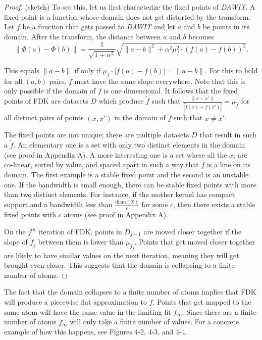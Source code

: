 \begin{proof} (sketch) To see this, let us first characterize the fixed points of
\textit{DAWIT}. A fixed point is a function whose domain does not get
distorted by the transform.
Let $f$ be a function that gets passed to \textit{DAWIT} and let
$a$ and $b$ be points in its domain.
 After the transform, the distance between $a$ and $b$ becomes
 $$\|\Phi(a)- \Phi(b)\| = \frac{1}{\sqrt{1 + \alpha^2}}
\sqrt{\|a-b\|^2 + \alpha^2\mu_f^2\cdot(f(a) - f(b))^2}.$$

This equals $\|a-b\|$ if only if $\mu_f \cdot |f(a) - f(b)| = \|a-b\|$.
For this to hold for all $(a,b)$ pairs, $f$ must have the same
slope everywhere.
Note that this is only possible if the domain of $f$ is one dimensional.
It follows that the fixed points of FDK
are datasets $D$ which produce $\tilde f$ such that
$\frac{\|x - x'\|}{|\tilde f(x) - \tilde f(x')|} = \mu_{\tilde f}$
for all distinct pairs of points $(x, x')$ in the domain of $\tilde f$ such
that $x \neq x'$.

The fixed points are not unique;
there are multiple datasets $D$ that result in such a $\tilde f$. An
elementary one is a set with only two distinct elements in the domain
(see proof in Appendix A).
A more interesting one is a set where all the $x_i$ are co-linear,
sorted by value, and spaced apart in such a way that $\tilde f$
is a line on its domain.
The first example is a stable fixed point and the second is an unstable one.
If the bandwidth is small enough, there can be stable fixed points
with more than two distinct elements.
For instance, if the mother kernel has compact support and a bandwidth less
than $\frac{\mathrm{diam}(X)}{c}$ for some $c$, then there exists a stable
fixed points with $c$ atoms (see proof in Appendix A).

On the $j^{th}$ iteration of FDK, points in $D_{j-1}$ are moved closer
together if the slope of $\tilde f_j$ between them is lower than
$\mu_{\tilde f_j}$.
Points that get moved closer together are likely to have similar values
on the next iteration, meaning they will get brought even closer.
This suggests that the domain is collapsing to a finite number of atoms.
\end{proof}

The fact that the domain collapses to a finite number of atoms implies
that FDK will produce a piecewise flat approximation to $f$.
Points that get mapped to the same atom will have the same value in the
limiting fit $\tilde f_\infty$.
Since there are a finite number of atoms $\tilde f_\infty$ will only take
a finite number of values. 
For a concrete example of how this happens, see Figures 4-2, 4-3, and 4-4.

